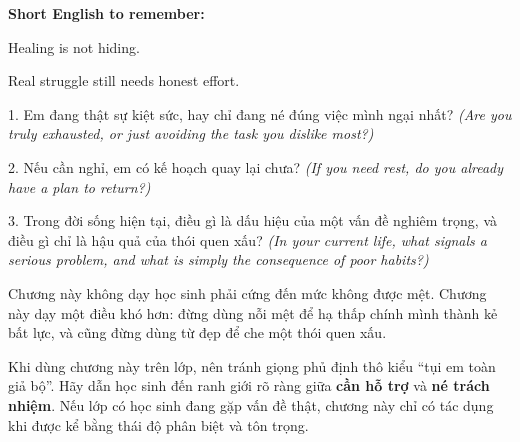 \begin{ghinhoanh}
\textbf{Short English to remember:}

Healing is not hiding.

Real struggle still needs honest effort.
\end{ghinhoanh}

\begin{tuhocnhanh}
1. Em đang thật sự kiệt sức, hay chỉ đang né đúng việc mình ngại nhất? \textit{(Are you truly exhausted, or just avoiding the task you dislike most?)}

2. Nếu cần nghỉ, em có kế hoạch quay lại chưa? \textit{(If you need rest, do you already have a plan to return?)}

3. Trong đời sống hiện tại, điều gì là dấu hiệu của một vấn đề nghiêm trọng, và điều gì chỉ là hậu quả của thói quen xấu? \textit{(In your current life, what signals a serious problem, and what is simply the consequence of poor habits?)}
\end{tuhocnhanh}

\begin{tongketchuong}
Chương này không dạy học sinh phải cứng đến mức không được mệt. Chương này dạy một điều khó hơn: đừng dùng nỗi mệt để hạ thấp chính mình thành kẻ bất lực, và cũng đừng dùng từ đẹp để che một thói quen xấu.
\end{tongketchuong}

\begin{goigiaovien}
Khi dùng chương này trên lớp, nên tránh giọng phủ định thô kiểu ``tụi em toàn giả bộ''. Hãy dẫn học sinh đến ranh giới rõ ràng giữa \textbf{cần hỗ trợ} và \textbf{né trách nhiệm}. Nếu lớp có học sinh đang gặp vấn đề thật, chương này chỉ có tác dụng khi được kể bằng thái độ phân biệt và tôn trọng.
\end{goigiaovien}

\ngancach